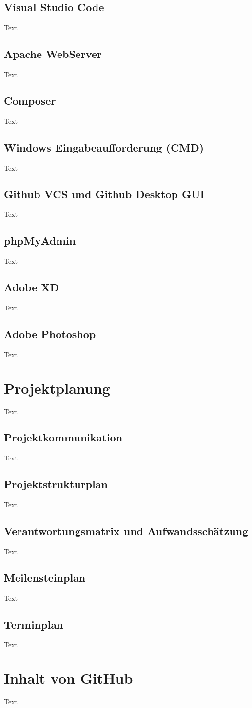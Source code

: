 \subsection{Visual Studio Code}
Text
\subsection{Apache WebServer}
Text
\subsection{Composer}
Text
\subsection{Windows Eingabeaufforderung (CMD)}
Text
\subsection{Github VCS und Github Desktop GUI}
Text
\subsection{ phpMyAdmin}
Text
\subsection{Adobe XD}
Text
\subsection{Adobe Photoshop}
Text



\section{Projektplanung}
Text
\subsection{Projektkommunikation}
Text
\subsection{Projektstrukturplan}
Text
\subsection{Verantwortungsmatrix und Aufwandsschätzung}
Text
\subsection{Meilensteinplan}
Text
\subsection{Terminplan}
Text


\section{Inhalt von GitHub}
Text






